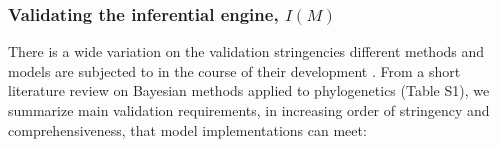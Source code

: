 \documentclass[oneside]{article}
\begin{document}

\subsubsection*{Validating the inferential engine, $I(M)$}

There is a wide variation on the validation stringencies different
methods and models are subjected to in the course of their
development \citep{darriba18}.
From a short literature review on Bayesian methods applied to
phylogenetics (Table S1), we summarize {\color{red}{four [could be more
    after literature review]}} main validation requirements,
in increasing order of stringency and comprehensiveness,
that model implementations can meet:
\end{document}
